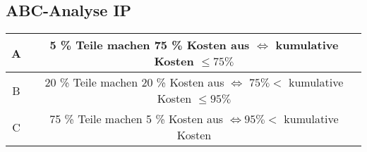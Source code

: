 \subsection{ABC-Analyse \hfill IP}
    \begin{scriptsize}
        \begin{center}
            \begin{tabular}{|c|c|}
                \hline
                \cellcolor{Red} A & 5 \% Teile machen 75 \% Kosten aus $\Leftrightarrow$ kumulative Kosten $\leq 75 \%$\\
                \hline
                \cellcolor{Yellow} B & 20 \% Teile machen 20 \% Kosten aus $\Leftrightarrow$ $ 75 \% < $ kumulative Kosten $ \leq 95\% $\\
                \hline
                \cellcolor{Green} C & 75 \% Teile machen 5 \% Kosten aus $\Leftrightarrow 95 \% < $ kumulative Kosten\\
                \hline
            \end{tabular}
        \end{center}
    \end{scriptsize}